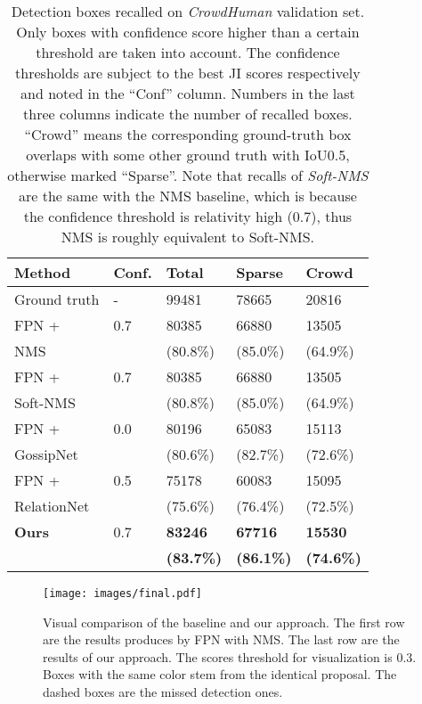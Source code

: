 \documentclass[10pt,twocolumn,letterpaper]{article}
\begin{document}
\begin{table}[ht]
   \centering
   \begin{tabular}{p{24mm}|p{7mm}<{\centering}|p{10mm}<{\centering}p{10mm}<{\centering}p{10mm}<{\centering}}
   \toprule
   Method & Conf. & Total & Sparse  & Crowd \\
   \hline
   Ground truth & - & 99481 & 78665 & 20816 \\
   \hline
   FPN + & 0.7 & 80385   & 66880 & 13505 \\
   NMS  	& & (80.8\%) & (85.0\%) & (64.9\%) \\
\hline
   FPN + & 0.7 & 80385   & 66880 & 13505 \\
   Soft-NMS \cite{softnms} & & (80.8\%) & (85.0\%) & (64.9\%) \\
   \hline
   FPN + & 0.0 & 80196 & 65083 & 15113 \\
   GossipNet \cite{learningnms} & & (80.6\%) & (82.7\%) & (72.6\%) \\
   \hline
   FPN + & 0.5 & 75178 & 60083 & 15095 \\
   RelationNet \cite{hu2017relation} & & (75.6\%) & (76.4\%) & (72.5\%) \\
   \hline
   \textbf{Ours}  & 0.7 &  \textbf{83246} & \textbf{67716} & \textbf{15530} \\
            & & \textbf{(83.7\%)} & \textbf{(86.1\%)} & \textbf{(74.6\%)} \\
   \bottomrule
   \end{tabular}
   \caption{Detection boxes recalled on \emph{CrowdHuman} validation set. 
   Only boxes with confidence score higher than a certain threshold are taken into account.
   The confidence thresholds are subject to the best JI scores respectively and noted in the ``Conf'' column.
   Numbers in the last three columns indicate the number of recalled boxes.
   ``Crowd'' means the corresponding ground-truth box overlaps with some other 
   ground truth with IoU0.5, otherwise marked ``Sparse''. 
   Note that recalls of \emph{Soft-NMS} \cite{softnms} are the same with the 
   NMS baseline, which is because the confidence threshold is relativity high 
   (0.7), thus NMS is roughly equivalent to Soft-NMS.  }

   \label{tbl:crowdhuman_recall}
\end{table}


\begin{figure*}
	\begin{center}
		\texttt{[image: images/final.pdf]}
	\end{center}
	\caption{Visual comparison of the baseline and our approach. The first row are the results produces by FPN with NMS. The last row are the results of our approach. The scores threshold for visualization is 0.3. Boxes with the same color stem from the identical proposal. The dashed boxes are the missed detection ones.}
	\label{fig:presentation}
\end{figure*}
\end{document}
